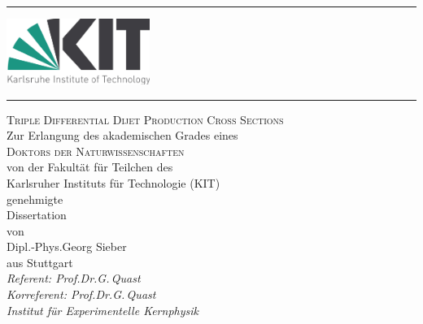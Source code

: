 \begin{titlepage}
	\begin{addmargin}[2cm]{0cm}
		\thispagestyle{empty}
		\begin{center}
			\vspace*{-2cm}
			\vspace{-0.3cm}
			\rule{\linewidth}{0.75pt}
			\vspace{-0.15cm}

			\includegraphics[width=0.35\textwidth]{figures/KIT_logo}

			\vspace{-0.3cm}
			\rule{\linewidth}{0.75pt}

			\vspace{2.8cm}


			\LARGE{\textsc{Triple Differential Dijet Production Cross Sections}}\\
			\vspace{3.0cm}
			\large{Zur Erlangung des akademischen Grades eines\\
			      \textsc{Doktors der Naturwissenschaften}\\
				von der Fakult\"at f\"ur Teilchen des\\
			Karlsruher Instituts f\"ur Technologie (KIT)\\ genehmigte}\\
			\vspace{0.5 cm}
			\large{Dissertation}\\
			\vspace{0.6 cm}
			\large{von}\\
			\vspace{0.3 cm}
			\large{Dipl.-Phys.\;Georg Sieber\\aus Stuttgart}\\
			\vspace{1.5 cm}
			\large{\textit{Referent: Prof.\;Dr.\;G.\,Quast\\Korreferent: Prof.\;Dr.\;G.\,Quast\\
			Institut f\"ur Experimentelle Kernphysik}}\\
		\end{center}
	\end{addmargin}
\end{titlepage}

\cleardoublepage


